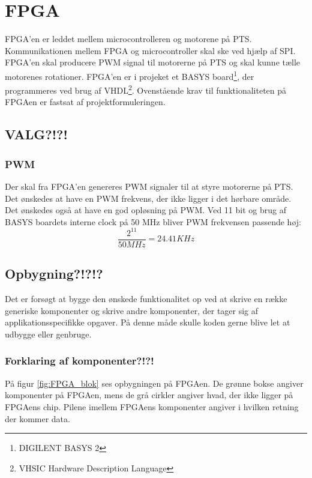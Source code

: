 \section{FPGA}
\label{sec:FPGA}

FPGA'en er leddet mellem microcontrolleren og motorene på PTS. 
Kommunikationen mellem FPGA og microcontroller skal ske ved hjælp af SPI. 
FPGA'en skal producere PWM signal til motorerne på PTS og skal kunne tælle motorenes rotationer. 
FPGA'en er i projeket et BASYS board\footnote{DIGILENT BASYS 2}, der programmeres ved brug af VHDL\footnote{VHSIC Hardware Description Language}.
Ovenstående krav til funktionaliteten på FPGAen er fastsat af 
projektformuleringen.


\subsection{VALG?!?!}
\subsubsection*{PWM}
Der skal fra FPGA'en genereres PWM signaler til at styre motorerne på PTS.
Det ønskedes at have en PWM frekvens, der ikke ligger i det hørbare område. 
Det ønskedes også at have en god opløsning på PWM. 
Ved 11 bit og brug af BASYS boardets interne clock på 50 MHz bliver PWM frekvensen passende høj:
\begin{equation}
  \frac{2^{11}}{50 MHz} = 24.41 KHz 
\end{equation}

\subsection{Opbygning?!?!?}
Det er forsøgt at bygge den ønskede funktionalitet op ved at skrive en række generiske komponenter og skrive andre komponenter, der tager sig af applikationsspecifikke opgaver. 
På denne måde skulle koden gerne blive let at udbygge eller genbruge. 
\subsubsection*{Forklaring af komponenter?!?!}
På figur \ref{fig:FPGA_blok} ses opbygningen på FPGAen. De grønne bokse angiver 
komponenter på FPGAen, mens de grå cirkler angiver hvad, der ikke ligger på 
FPGAens chip. Pilene imellem FPGAens komponenter angiver i hvilken retning der 
kommer data.

